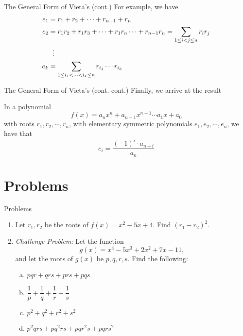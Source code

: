\documentclass[aspectratio=169,xcolor=dvipsnames]{beamer}
\begin{document}
\begin{frame}[t]{The General Form of Vieta's (cont.)}
    For example, we have
    \[
        \begin{aligned}
        e_1 &= r_1+r_2+\cdots+r_{n-1}+r_n\\
        e_2 &=r_1r_2+r_1r_3+\cdots +r_1r_n\cdots +r_{n-1}r_n= \sum_{1\le i<j\le n} r_i r_j\\
        &\hspace{0.2cm} \vdots\\
        e_k &= \sum_{1\le i_1<\cdots<i_k\le n} r_{i_1}\cdots r_{i_k}
        \end{aligned}
        \]
\end{frame}
\begin{frame}[t]{The General Form of Vieta's (cont. cont.)}
    Finally, we arrive at the result
    \begin{theorem}
        In a polynomial \[f(x)=a_nx^n+a_{n-1}x^{n-1}\cdots a_1x+a_0\] with roots $r_1,r_2,\cdots,r_n$, with elementary symmetric polynomials $e_1,e_2,\cdots,e_n$, we have that
        \[e_i=\frac{(-1)^i\cdot a_{n-i}}{a_n}\]
    \end{theorem}
\end{frame}
\section{Problems}
\begin{frame}[t]{Problems}
    \begin{enumerate}
        \item Let \(r_1, r_2\) be the roots of \(f(x)=x^2-5x+4\). Find \((r_1-r_2)^2\).
        \item \textit{Challenge Problem: } Let the function 
        \[g(x) = x^4 - 5x^3 + 2x^2 +7x - 11,\] and let the roots of $g(x)$ be $p,q,r,s$. Find the following: \\
        \begin{enumerate}[a)]
            \item $pqr+qrs+prs+pqs$
            \item $\dfrac{1}{p}+\dfrac{1}{q}+\dfrac{1}{r}+\dfrac{1}{s}$
            \item $p^2 +q^2 + r^2 + s^2$
            \item $p^2qrs + pq^2rs + pqr^2s + pqrs^2$
        \end{enumerate} 
    \end{enumerate}
\end{frame}
\end{document}

